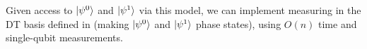 \begin{lemma}\label{lem:computational efficiency}
    Given access to $\lvert\smash{\psi^{ 0}}\rangle$ and $\lvert\smash{\psi^{ 1}}\rangle$ via this model, we can implement measuring in the DT basis defined in  (making $\lvert\smash{\psi^0}\rangle$ and $\lvert\smash{\psi^1}\rangle$ phase states), using $O(n)$ time and single-qubit measurements.
\end{lemma}

